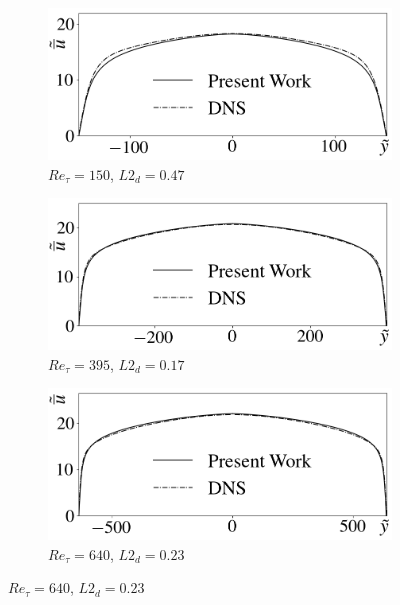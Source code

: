 \documentclass[10pt]{article} %
\begin{document}
\begin{figure}[!h]
	\centering
	\begin{subfigure}[t]{0.5\textwidth}
		\centering
		\includegraphics[angle=0, scale=0.24]{fotos_formatacao_final/Temperature_150_Avelocity}
		\caption{$Re_\tau = 150$, $L2_d = 0.47$}
	\end{subfigure}
	\begin{subfigure}[t]{0.45\textwidth}
		\centering
		\includegraphics[angle=0, scale=0.24]{fotos_formatacao_final/Temperature_395_Avelocity}
		\caption{$Re_\tau = 395$, $L2_d = 0.17$}
	\end{subfigure}
	\begin{subfigure}[t]{0.5\textwidth}
		\centering
		\includegraphics[angle=0, scale=0.24]{fotos_formatacao_final/Temperature_640_Avelocity}
		\caption{$Re_\tau = 640$, $L2_d = 0.23$}
	\end{subfigure}

\end{figure}
\end{document}
